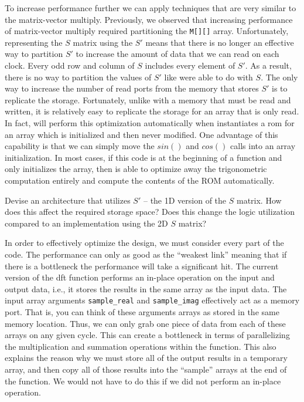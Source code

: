 To increase performance further we can apply techniques that are very similar to the matrix-vector multiply.  Previously, we observed that increasing performance of matrix-vector multiply required partitioning the \lstinline|M[][]| array.  Unfortunately, representing the $S$ matrix using the $S'$ means that there is no longer an effective way to partition $S'$ to increase the amount of data that we can read on each clock. Every odd row and column of $S$ includes every element of $S'$.  As a result, there is no way to partition the values of $S'$ like were able to do with $S$.  The only way to increase the number of read ports from the memory that stores $S'$ is to replicate the storage.  Fortunately, unlike with a memory that must be read and written, it is relatively easy to replicate the storage for an array that is only read.  In fact, \VHLS will perform this optimization automatically when instantiates a \gls{rom} for an array which is initialized and then never modified.  One advantage of this capability is that we can simply move the $sin()$ and $cos()$ calls into an array initialization.  In most cases, if this code is at the beginning of a function and only initializes the array, then \VHLS is able to optimize away the trigonometric computation entirely and compute the contents of the ROM automatically.

\begin{exercise}
Devise an architecture that utilizes $S'$ -- the 1D version of the $S$ matrix. How does this affect the required storage space? Does this change the logic utilization compared to an implementation using the 2D $S$ matrix? 
\end{exercise}

In order to effectively optimize the design, we must consider every part of the code. The performance can only as good as the ``weakest link'' meaning that if there is a bottleneck the performance will take a significant hit. The current version of the \gls{dft} function performs an in-place operation on the input and output data, i.e., it stores the results in the same array as the input data. The input array arguments \lstinline|sample_real| and \lstinline|sample_imag| effectively act as a memory port. That is, you can think of these arguments arrays as stored in the same memory location. Thus, we can only grab one piece of data from each of these arrays on any given cycle. This can create a bottleneck in terms of parallelizing the multiplication and summation operations within the function. This also explains the reason why we must store all of the output results in a temporary array, and then copy all of those results into the ``sample'' arrays at the end of the function. We would not have to do this if we did not perform an in-place operation. 

